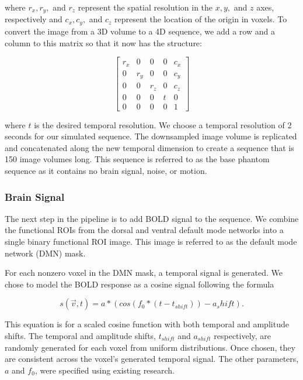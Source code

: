 \noindent where $r_x, r_y,$ and $r_z$ represent the spatial resolution in the $x, y,$ and $z$ axes, respectively and $c_x, c_y,$ and $c_z$ represent the location of the origin in voxels. To convert the image from a 3D volume to a 4D sequence, we add a row and a column to this matrix so that it now has the structure:

\begin{equation}
\begin{bmatrix}
 r_x &  0   &  0   & 0 & c_x\\ 
 0   &  r_y &  0   & 0 & c_y \\ 
 0   &  0   &  r_z & 0 & c_z \\ 
 0   &  0   &  0   & t & 0 \\
 0   &  0   &  0   & 0 & 1 
\end{bmatrix}
\end{equation}

\noindent where $t$ is the desired temporal resolution. We choose a temporal resolution of 2 seconds for our simulated sequence. The downsampled image volume is replicated and concatenated along the new temporal dimension to create a sequence that is 150 image volumes long. This sequence is referred to as the base phantom sequence as it contains no brain signal, noise, or motion.

\subsubsection{Brain Signal}

The next step in the pipeline is to add BOLD signal to the sequence. %
We combine the functional ROIs from the dorsal and ventral default mode networks into a single binary functional ROI image. This image is referred to as the default mode network (DMN) mask. 

For each nonzero voxel in the DMN mask, a temporal signal is generated. We chose to model the BOLD response as a cosine signal following the formula

\begin{equation}
s(\vec{v}, t) = a*(cos(f_0 * (t-t_{shift})) - a_shift).
\label{ch5:bold_eq}
\end{equation}

\noindent This equation is for a scaled cosine function with both temporal and amplitude shifts. The temporal and amplitude shifts, $t_{shift}$ and $a_{shift}$ respectively, are randomly generated for each voxel from uniform distributions. Once chosen, they are consistent across the voxel's generated temporal signal. The other parameters, $a$ and $f_0$, were specified using existing research. 

